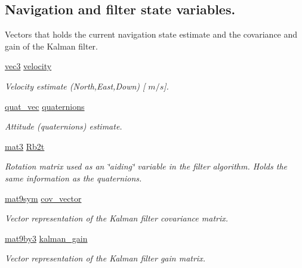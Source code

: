\subsection*{\-Navigation and filter state variables.}
\label{_amgrp0f8fa76f99fe991372a251de33492bc0}%
 \-Vectors that holds the current navigation state estimate and the covariance and gain of the \-Kalman filter. \begin{DoxyCompactItemize}
\item 
\hyperlink{nav__types_8h_a90c683614d896321009d3b3c401b764f}{vec3} \hyperlink{group__tables_ga589efe00d8bd4e8a69613f98390a04c7}{velocity}
\begin{DoxyCompactList}\small\item\em \-Velocity estimate (\-North,\-East,\-Down) \mbox{[} $m/s$\mbox{]}. \end{DoxyCompactList}\item 
\hyperlink{nav__types_8h_ad9a64f455fa02affaba6740746aae7b2}{quat\-\_\-vec} \hyperlink{group__tables_ga059b83d370e7e6a5e9728a8f91943051}{quaternions}
\begin{DoxyCompactList}\small\item\em \-Attitude (quaternions) estimate. \end{DoxyCompactList}\item 
\hyperlink{nav__types_8h_ab7675278cb555aa98b43c97694753329}{mat3} \hyperlink{group__tables_ga42753cbc9ae76483da3cbc331a011586}{\-Rb2t}
\begin{DoxyCompactList}\small\item\em \-Rotation matrix used as an \char`\"{}aiding\char`\"{} variable in the filter algorithm. \-Holds the same information as the quaternions. \end{DoxyCompactList}\item 
\hyperlink{nav__types_8h_a0f4089eb3ad75e0675d7f7d3914fddeb}{mat9sym} \hyperlink{group__tables_ga74c09cdfc5b901e7f842dbe42ed8f4f4}{cov\-\_\-vector}
\begin{DoxyCompactList}\small\item\em \-Vector representation of the \-Kalman filter covariance matrix. \end{DoxyCompactList}\item 
\hyperlink{nav__types_8h_af1d09a15760e21f5de26f0839f1b6c62}{mat9by3} \hyperlink{group__tables_gac1df051c6f380aa8d1598b15ee9e6eca}{kalman\-\_\-gain}
\begin{DoxyCompactList}\small\item\em \-Vector representation of the \-Kalman filter gain matrix. \end{DoxyCompactList}\end{DoxyCompactItemize}


